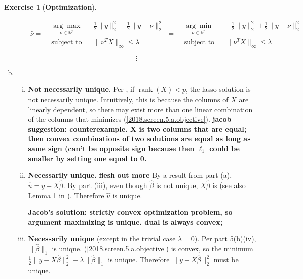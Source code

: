 \documentclass{article}
\theoremstyle{definition}
\newtheorem{exercise}{Exercise}
\theoremstyle{definition}
\theoremstyle{definition}
\theoremstyle{definition}
\begin{document}
\begin{exercise}[\textbf{Optimization}]
\begin{enumerate}[(a)]
\[
 \qquad \hat{\nu} = 
\begin{aligned}
& \underset{\nu \in \mathbb{R}^p}{\arg \max}
& & \frac{1}{2} \lVert y \rVert_2^2 - \frac{1}{2} \lVert y - \nu \rVert_2^2  \\
& \text{subject to}
& & \lVert \nu^TX \rVert_\infty \leq \lambda
\end{aligned} = 
\begin{aligned}
& \underset{\nu \in \mathbb{R}^p}{\arg \min}
& & -\frac{1}{2} \lVert y \rVert_2^2 + \frac{1}{2} \lVert y - \nu \rVert_2^2  \\
& \text{subject to}
& & \lVert \nu^TX \rVert_\infty \leq \lambda
\end{aligned}
\]

\[
\vdots
\]

\item

\begin{enumerate}[(i)]

\item \textbf{Not necessarily unique.} Per \citet{Tibshirani2013}, if \(\operatorname{rank}(X) < p\), the lasso solution is not necessarily unique. Intuitively, this is because the columns of \(X\) are linearly dependent, so there may exist more than one linear combination of the columns that minimizes (\ref{2018.screen.5.a.objective}). \textbf{jacob suggestion: counterexample. X is two columns that are equal; then convex combinations of two solutions are equal as long as same sign (can't be opposite sign because then \(\ell_1\) could be smaller by setting one equal to 0.}

\item \textbf{Necessarily unique.} \textbf{flesh out more} By a result from part (a), \(\hat{u} = y - X \hat{\beta}\). By part (iii), even though \(\hat{\beta}\) is not unique, \(X \hat{\beta}\) is (see also Lemma 1 in \citet{Tibshirani2013}). Therefore \(\hat{u}\) is unique.

\textbf{Jacob's solution: strictly convex optimization problem, so argument maximizing is unique. dual is always convex; } 

\item \textbf{Necessarily unique} (except in the trivial case \(\lambda=0\)). Per part 5(b)(iv), \(\lVert \hat{\beta} \rVert_1\) is unique. (\ref{2018.screen.5.a.objective}) is convex, so the minimum \(\frac{1}{2} \lVert y - X \hat{\beta} \rVert_2^2 + \lambda \lVert \hat{\beta} \rVert_1\) is unique. Therefore \( \lVert y - X \hat{\beta} \rVert_2^2\) must be unique.


\end{enumerate}
\end{enumerate}
\end{exercise}
\end{document}

